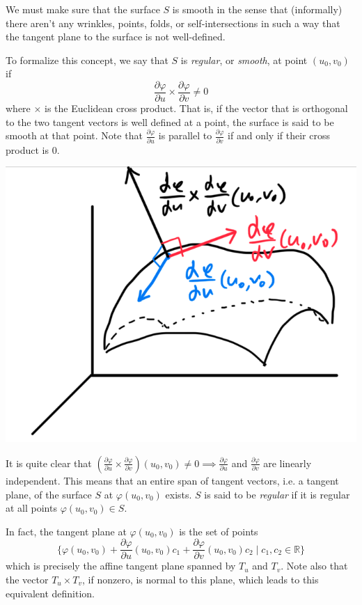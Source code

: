   We must make sure that the surface $S$ is smooth in the sense that (informally) there aren't any wrinkles, points, folds, or self-intersections in such a way that the tangent plane to the surface is not well-defined. 

  \begin{definition}
  To formalize this concept, we say that $S$ is \textit{regular}, or \textit{smooth}, at point $(u_0, v_0)$ if
  \[\frac{\partial \varphi}{\partial u} \times \frac{\partial \varphi}{\partial v} \neq 0\]
  where $\times$ is the Euclidean cross product. That is, if the vector that is orthogonal to the two tangent vectors is well defined at a point, the surface is said to be smooth at that point. Note that $\frac{\partial \varphi}{\partial u}$ is parallel to $\frac{\partial \varphi}{\partial v}$ if and only if their cross product is $0$. 
  \begin{center}
      \includegraphics[scale=0.3]{img/Cross_Product_Regular_Surfaces.PNG}
  \end{center}
  It is quite clear that $(\frac{\partial \varphi}{\partial u} \times \frac{\partial \varphi}{\partial v})(u_0, v_0) \neq 0 \implies \frac{\partial \varphi}{\partial u}$ and $\frac{\partial \varphi}{\partial v}$ are linearly independent. This means that an entire span of tangent vectors, i.e. a tangent plane, of the surface $S$ at $\varphi(u_0, v_0)$ exists. 
  $S$ is said to be \textit{regular} if it is regular at all points $\varphi(u_0, v_0) \in S$. 
  \end{definition}

  In fact, the tangent plane at $\varphi(u_0, v_0)$ is the set of points 
  \[\{\varphi(u_0, v_0) + \frac{\partial \varphi}{\partial u} (u_0, v_0) c_1 + \frac{\partial \varphi}{\partial v} (u_0, v_0) c_2 \; | \; c_1, c_2 \in \mathbb{R} \}\]
  which is precisely the affine tangent plane spanned by $T_u$ and $T_v$. Note also that the vector $T_u \times T_v$, if nonzero, is normal to this plane, which leads to this equivalent definition. 

